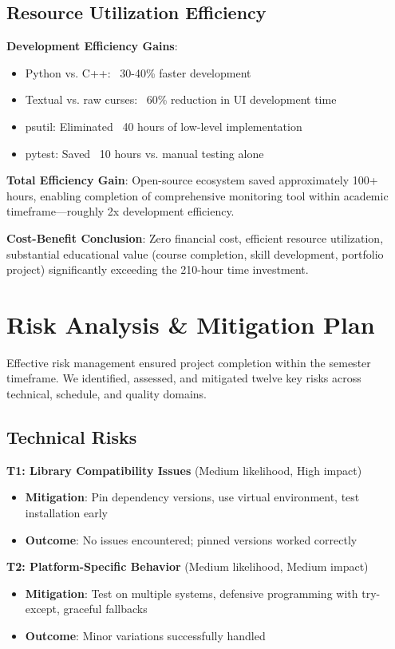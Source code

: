 \documentclass[12pt,a4paper,oneside]{report}
\begin{document}
\subsection{Resource Utilization Efficiency}

\textbf{Development Efficiency Gains}:
\begin{itemize}
    \item Python vs. C++: ~30-40\% faster development
    \item Textual vs. raw curses: ~60\% reduction in UI development time
    \item psutil: Eliminated ~40 hours of low-level implementation
    \item pytest: Saved ~10 hours vs. manual testing alone
\end{itemize}

\textbf{Total Efficiency Gain}: Open-source ecosystem saved approximately 100+ hours, enabling completion of comprehensive monitoring tool within academic timeframe---roughly 2x development efficiency.

\textbf{Cost-Benefit Conclusion}: Zero financial cost, efficient resource utilization, substantial educational value (course completion, skill development, portfolio project) significantly exceeding the 210-hour time investment.

\section{Risk Analysis \& Mitigation Plan}
\label{sec:risk-analysis}

Effective risk management ensured project completion within the semester timeframe. We identified, assessed, and mitigated twelve key risks across technical, schedule, and quality domains.

\subsection{Technical Risks}

\textbf{T1: Library Compatibility Issues} (Medium likelihood, High impact)
\begin{itemize}
    \item \textbf{Mitigation}: Pin dependency versions, use virtual environment, test installation early
    \item \textbf{Outcome}: No issues encountered; pinned versions worked correctly
\end{itemize}

\textbf{T2: Platform-Specific Behavior} (Medium likelihood, Medium impact)
\begin{itemize}
    \item \textbf{Mitigation}: Test on multiple systems, defensive programming with try-except, graceful fallbacks
    \item \textbf{Outcome}: Minor variations successfully handled
\end{itemize}
\end{document}
